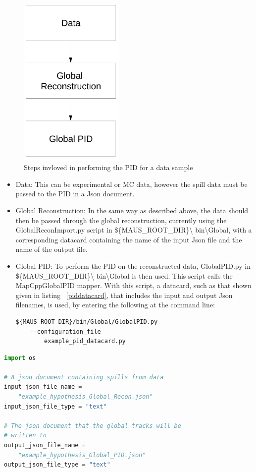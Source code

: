 \documentclass[a4paper,12pt]{article}
\begin{document}
\begin{figure}[h!]
\begin{center} 
\includegraphics[width=2in]{pidperfflow.pdf} 
\caption{Steps invloved in performing the PID for a data sample}
\label{pidperf}
\end{center} 
\end{figure}
			
\begin{itemize}
\item Data: This can be experimental or MC data, however the spill data must be passed to the PID in a Json document.
\item Global Reconstruction: In the same way as described above, the 
data should then be passed through the global reconstruction, 
currently using the GlobalReconImport.py script in \$\{MAUS\_ROOT\_DIR\}\textbackslash 
bin\textbackslash Global, with a corresponding datacard containing the name of the input Json file and the name of the output file.
\item Global PID: To perform the PID on the reconstructed data, GlobalPID.py in \$\{MAUS\_ROOT\_DIR\}\textbackslash 
bin\textbackslash Global is then used. This script calls the 
MapCppGlobalPID mapper. With this script, a datacard, such as that 
shown given in listing ~\ref{piddatacard}, that includes the input and output Json filenames, is used, by entering the following at the command line:
\begin{lstlisting}[breaklines=true,basicstyle=\ttfamily]
${MAUS_ROOT_DIR}/bin/Global/GlobalPID.py 
	--configuration_file 
		example_pid_datacard.py
\end{lstlisting}
\end{itemize}

\begin{lstlisting}[language=Python,basicstyle=\ttfamily,breaklines=true,frame=single,commentstyle=\color{gray}, keywordstyle=\color{red}\bfseries,stringstyle=\color{green!50!black},captionpos=b,caption={An example datacard (example\_pid\_datacard.py) for use with GlobalPID.py},label=piddatacard]
import os

# A json document containing spills from data
input_json_file_name = 
	"example_hypothesis_Global_Recon.json"
input_json_file_type = "text"

# The json document that the global tracks will be
# written to
output_json_file_name = 
	"example_hypothesis_Global_PID.json"
output_json_file_type = "text"
\end{lstlisting}
\end{document}

